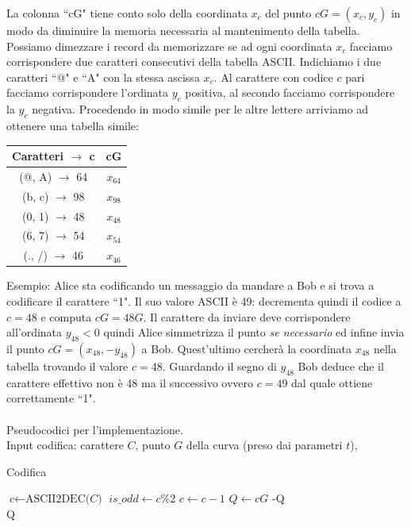 \documentclass[a4paper,12pt]{tesiinfo}
\begin{document}
La colonna ``cG" tiene conto solo della coordinata $x_c$ del punto $cG=(x_c, y_c)$ in modo da diminuire la memoria necessaria al mantenimento della tabella. Possiamo dimezzare i record da memorizzare se ad ogni coordinata $x_c$ facciamo corrispondere due caratteri consecutivi della tabella ASCII. Indichiamo i due caratteri ``@" e ``A" con la stessa ascissa $x_c$. Al carattere con codice $c$ pari facciamo corrispondere l'ordinata $y_c$ positiva, al secondo facciamo corrispondere la $y_c$ negativa. Procedendo in modo simile per le altre lettere arriviamo ad ottenere una tabella simile:
\begin{center}
\begin{tabular}{ c c }
 Caratteri $\to$ c & cG\\
 \hline
 (@, A) $\to$ 64 & $x_{64}$\\
 (b, c) $\to$ 98 & $x_{98}$\\
 (0, 1) $\to$ 48 & $x_{48}$\\
 (6, 7) $\to$ 54 & $x_{54}$\\
 (., /) $\to$ 46 & $x_{46}$
 \label{decodifica2}
\end{tabular}
\end{center}
Esempio: Alice sta codificando un messaggio da mandare a Bob e si trova a codificare il carattere ``1". Il suo valore ASCII \`e 49: decrementa quindi il codice a $c=48$ e computa $cG=48G$. Il carattere da inviare deve corrispondere all'ordinata $y_{48}<0$ quindi Alice simmetrizza il punto \textit{se necessario} ed infine invia il punto $cG = (x_{48}, -y_{48})$ a Bob. Quest'ultimo cercher\`a la coordinata $x_{48}$ nella tabella trovando il valore $c=48$. Guardando il segno di $y_{48}$ Bob deduce che il carattere effettivo non \`e 48 ma il successivo ovvero $c=49$ dal quale ottiene correttamente ``1".
\\
\\
Pseudocodici per l'implementazione.
\\
Input codifica: carattere $C$, punto $G$ della curva (preso dai parametri $t$),
\begin{algorithm}[H]
\caption{Codifica}
\begin{algorithmic}
\State $\textit{c} \gets \text{ASCII2DEC}\textit{(C)}$ 
\State $is\_odd \gets \textit{c\%2}$
\State $c \gets c-1$
\EndIf
\State $Q \gets cG$
\Return -Q
\EndIf\\
\Return Q
\end{algorithmic}
\end{algorithm}
\end{document}
